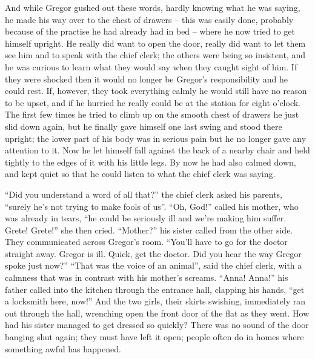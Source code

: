 And while Gregor gushed out these words, hardly knowing what he was
saying, he made his way over to the chest of drawers – this was easily
done, probably because of the practise he had already had in bed – where
he now tried to get himself upright. He really did want to open the
door, really did want to let them see him and to speak with the chief
clerk; the others were being so insistent, and he was curious to learn
what they would say when they caught sight of him. If they were shocked
then it would no longer be Gregor’s responsibility and he could rest.
If, however, they took everything calmly he would still have no reason
to be upset, and if he hurried he really could be at the station for
eight o’clock. The first few times he tried to climb up on the smooth
chest of drawers he just slid down again, but he finally gave himself
one last swing and stood there upright; the lower part of his body was
in serious pain but he no longer gave any attention to it. Now he let
himself fall against the back of a nearby chair and held tightly to the
edges of it with his little legs. By now he had also calmed down, and
kept quiet so that he could listen to what the chief clerk was saying.

“Did you understand a word of all that?” the chief clerk asked his
parents, “surely he’s not trying to make fools of us”. “Oh, God!”
called his mother, who was already in tears, “he could be seriously ill
and we’re making him suffer. Grete! Grete!” she then cried. “Mother?”
his sister called from the other side. They communicated across
Gregor’s room. “You’ll have to go for the doctor straight away. Gregor
is ill. Quick, get the doctor. Did you hear the way Gregor spoke just
now?” “That was the voice of an animal”, said the chief clerk, with a
calmness that was in contrast with his mother’s screams. “Anna! Anna!”
his father called into the kitchen through the entrance hall, clapping
his hands, “get a locksmith here, now!” And the two girls, their skirts
swishing, immediately ran out through the hall, wrenching open the
front door of the flat as they went. How had his sister managed to get
dressed so quickly? There was no sound of the door banging shut again;
they must have left it open; people often do in homes where something
awful has happened.

